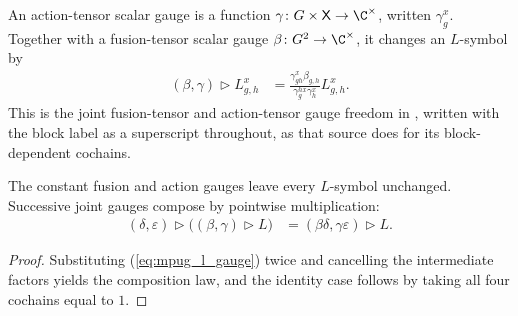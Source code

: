 \begin{definition}
    \label{def:mpug_l_gauge}
    \leanok
    An action-tensor scalar gauge is a function
    $\gamma\colon G\times\mathsf X\to\C^\times$, written $\gamma^x_g$.
    Together with a fusion-tensor scalar gauge $\beta\colon G^2\to\C^\times$,
    it changes an $L$-symbol by
    \begin{align}
        (\beta,\gamma)\mathbin{\triangleright}L^x_{g,h}
         & =\frac{\gamma^x_{gh}\beta_{g,h}}
        {\gamma^{h x}_g\gamma^x_h}L^x_{g,h}.
        \label{eq:mpug_l_gauge}
    \end{align}
    This is the joint fusion-tensor and action-tensor gauge freedom in
    \cite{FrancoRubio2025MPUGauging}, written with the block label as a
    superscript throughout, as that source does for its block-dependent
    cochains.
\end{definition}

\begin{lemma}
    \label{thm:mpug_l_gauge_composition}
    \leanok
    The constant fusion and action gauges leave every $L$-symbol unchanged.
    Successive joint gauges compose by pointwise multiplication:
    \begin{align}
        (\delta,\varepsilon)\mathbin{\triangleright}
        \bigl((\beta,\gamma)\mathbin{\triangleright}L\bigr)
         & = (\beta\delta,\gamma\varepsilon)
        \mathbin{\triangleright}L.
        \label{eq:mpug_l_gauge_composition}
    \end{align}
\end{lemma}

\begin{proof}\leanok
    Substituting (\ref{eq:mpug_l_gauge}) twice and cancelling the intermediate
    factors yields the composition law, and the identity case
    follows by taking all four cochains equal to $1$.
\end{proof}

